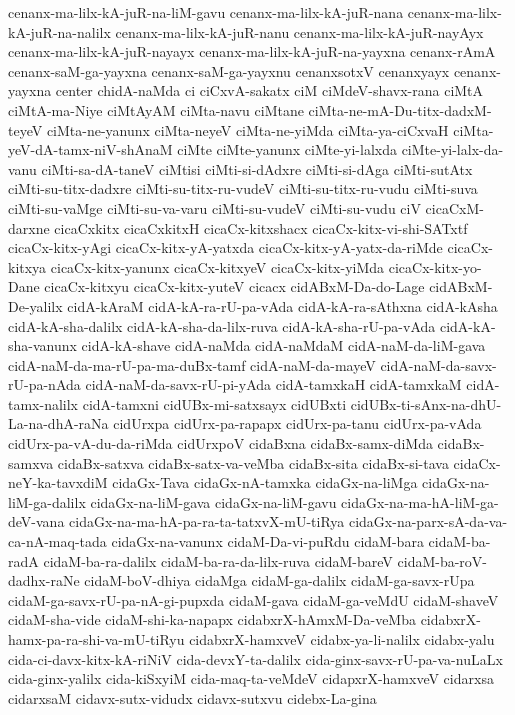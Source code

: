{cenanx-ma-lilx-kA-juR-na-liM-gavu
cenanx-ma-lilx-kA-juR-nana
cenanx-ma-lilx-kA-juR-na-nalilx
cenanx-ma-lilx-kA-juR-nanu
cenanx-ma-lilx-kA-juR-nayAyx
cenanx-ma-lilx-kA-juR-nayayx
cenanx-ma-lilx-kA-juR-na-yayxna
cenanx-rAmA
cenanx-saM-ga-yayxna
cenanx-saM-ga-yayxnu
cenanxsotxV
cenanxyayx
cenanx-yayxna
center
chidA-naMda
ci
ciCxvA-sakatx
ciM
ciMdeV-shavx-rana
ciMtA
ciMtA-ma-Niye
ciMtAyAM
ciMta-navu
ciMtane
ciMta-ne-mA-Du-titx-dadxM-teyeV
ciMta-ne-yanunx
ciMta-neyeV
ciMta-ne-yiMda
ciMta-ya-ciCxvaH
ciMta-yeV-dA-tamx-niV-shAnaM
ciMte
ciMte-yanunx
ciMte-yi-lalxda
ciMte-yi-lalx-da-vanu
ciMti-sa-dA-taneV
ciMtisi
ciMti-si-dAdxre
ciMti-si-dAga
ciMti-sutAtx
ciMti-su-titx-dadxre
ciMti-su-titx-ru-vudeV
ciMti-su-titx-ru-vudu
ciMti-suva
ciMti-su-vaMge
ciMti-su-va-varu
ciMti-su-vudeV
ciMti-su-vudu
ciV
cicaCxM-darxne
cicaCxkitx
cicaCxkitxH
cicaCx-kitxshacx
cicaCx-kitx-vi-shi-SATxtf
cicaCx-kitx-yAgi
cicaCx-kitx-yA-yatxda
cicaCx-kitx-yA-yatx-da-riMde
cicaCx-kitxya
cicaCx-kitx-yanunx
cicaCx-kitxyeV
cicaCx-kitx-yiMda
cicaCx-kitx-yo-Dane
cicaCx-kitxyu
cicaCx-kitx-yuteV
cicacx
cidABxM-Da-do-Lage
cidABxM-De-yalilx
cidA-kAraM
cidA-kA-ra-rU-pa-vAda
cidA-kA-ra-sAthxna
cidA-kAsha
cidA-kA-sha-dalilx
cidA-kA-sha-da-lilx-ruva
cidA-kA-sha-rU-pa-vAda
cidA-kA-sha-vanunx
cidA-kA-shave
cidA-naMda
cidA-naMdaM
cidA-naM-da-liM-gava
cidA-naM-da-ma-rU-pa-ma-duBx-tamf
cidA-naM-da-mayeV
cidA-naM-da-savx-rU-pa-nAda
cidA-naM-da-savx-rU-pi-yAda
cidA-tamxkaH
cidA-tamxkaM
cidA-tamx-nalilx
cidA-tamxni
cidUBx-mi-satxsayx
cidUBxti
cidUBx-ti-sAnx-na-dhU-La-na-dhA-raNa
cidUrxpa
cidUrx-pa-rapapx
cidUrx-pa-tanu
cidUrx-pa-vAda
cidUrx-pa-vA-du-da-riMda
cidUrxpoV
cidaBxna
cidaBx-samx-diMda
cidaBx-samxva
cidaBx-satxva
cidaBx-satx-va-veMba
cidaBx-sita
cidaBx-si-tava
cidaCx-neY-ka-tavxdiM
cidaGx-Tava
cidaGx-nA-tamxka
cidaGx-na-liMga
cidaGx-na-liM-ga-dalilx
cidaGx-na-liM-gava
cidaGx-na-liM-gavu
cidaGx-na-ma-hA-liM-ga-deV-vana
cidaGx-na-ma-hA-pa-ra-ta-tatxvX-mU-tiRya
cidaGx-na-parx-sA-da-va-ca-nA-maq-tada
cidaGx-na-vanunx
cidaM-Da-vi-puRdu
cidaM-bara
cidaM-ba-radA
cidaM-ba-ra-dalilx
cidaM-ba-ra-da-lilx-ruva
cidaM-bareV
cidaM-ba-roV-dadhx-raNe
cidaM-boV-dhiya
cidaMga
cidaM-ga-dalilx
cidaM-ga-savx-rUpa
cidaM-ga-savx-rU-pa-nA-gi-pupxda
cidaM-gava
cidaM-ga-veMdU
cidaM-shaveV
cidaM-sha-vide
cidaM-shi-ka-napapx
cidabxrX-hAmxM-Da-veMba
cidabxrX-hamx-pa-ra-shi-va-mU-tiRyu
cidabxrX-hamxveV
cidabx-ya-li-nalilx
cidabx-yalu
cida-ci-davx-kitx-kA-riNiV
cida-devxY-ta-dalilx
cida-ginx-savx-rU-pa-va-nuLaLx
cida-ginx-yalilx
cida-kiSxyiM
cida-maq-ta-veMdeV
cidapxrX-hamxveV
cidarxsa
cidarxsaM
cidavx-sutx-vidudx
cidavx-sutxvu
cidebx-La-gina
}
